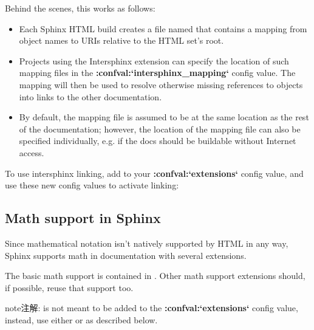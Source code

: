 \documentclass[letterpaper,10pt,english]{sphinxmanual}
\begin{document}
Behind the scenes, this works as follows:
\begin{itemize}
\item {} 
Each Sphinx HTML build creates a file named  that contains
a mapping from object names to URIs relative to the HTML set's root.

\item {} 
Projects using the Intersphinx extension can specify the location of such
mapping files in the {\color{red}\bfseries{}:confval:{}`intersphinx\_mapping{}`} config value.  The mapping
will then be used to resolve otherwise missing references to objects into
links to the other documentation.

\item {} 
By default, the mapping file is assumed to be at the same location as the rest
of the documentation; however, the location of the mapping file can also be
specified individually, e.g. if the docs should be buildable without Internet
access.

\end{itemize}

To use intersphinx linking, add  to your
{\color{red}\bfseries{}:confval:{}`extensions{}`} config value, and use these new config values to activate
linking:


\subsection{Math support in Sphinx}
\label{ext/math::doc}\label{ext/math:module-sphinx.ext.mathbase}\label{ext/math:math-support-in-sphinx}

Since mathematical notation isn't natively supported by HTML in any way, Sphinx
supports math in documentation with several extensions.

The basic math support is contained in {\hyperref[ext/math:module\string-sphinx.ext.mathbase]{}}. Other math
support extensions should, if possible, reuse that support too.

\begin{notice}{note}{注解:}
{\hyperref[ext/math:module\string-sphinx.ext.mathbase]{}} is not meant to be added to the {\color{red}\bfseries{}:confval:{}`extensions{}`} config
value, instead, use either {\hyperref[ext/math:module\string-sphinx.ext.pngmath]{}} or
{\hyperref[ext/math:module\string-sphinx.ext.mathjax]{}} as described below.
\end{notice}
\end{document}
